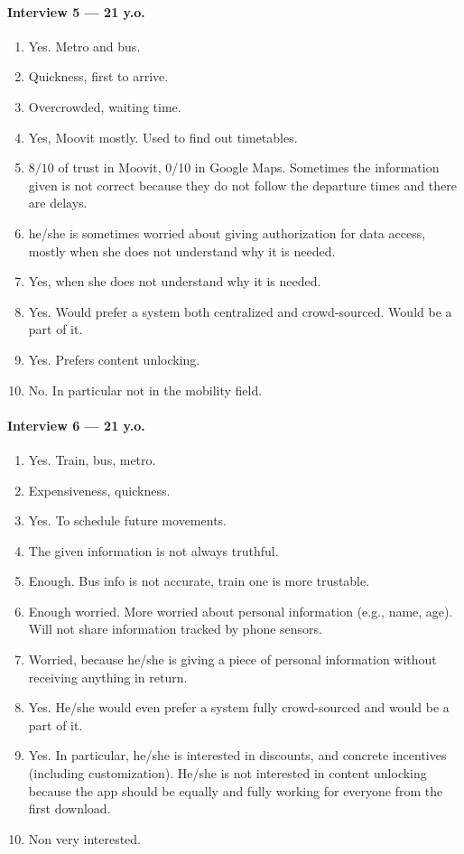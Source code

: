 \documentclass[a4paper, 11pt, twocolumn]{article}
\begin{document}
\paragraph*{Interview 5 --- 21 y.o.}
\begin{enumerate}
	\item Yes. Metro and bus.
	\item Quickness, first to arrive.
	\item Overcrowded, waiting time.
	\item Yes, Moovit mostly. Used to find out timetables.
	\item $8/10$ of trust in Moovit, 0/10 in Google Maps. Sometimes the information given is not correct because they do not follow the departure times and there are delays.
	\item he/she is sometimes worried about giving authorization for data access, mostly when she does not understand why it is needed.
	\item Yes, when she does not understand why it is needed.
	\item Yes. Would prefer a system both centralized and crowd-sourced. Would be a part of it.
	\item Yes. Prefers content unlocking.
	\item No. In particular not in the mobility field.
\end{enumerate}


\paragraph*{Interview 6 --- 21 y.o.}
\begin{enumerate}
	\item Yes. Train, bus, metro.
	\item Expensiveness, quickness.
	\item Yes. To schedule future movements.
	\item The given information is not always truthful.
	\item Enough. Bus info is not accurate, train one is more trustable.
	\item Enough worried. More worried about personal information (e.g., name, age). Will not share information tracked by phone sensors.
	\item Worried, because he/she is giving a piece of personal information without receiving anything in return.
	\item Yes. He/she would even prefer a system fully crowd-sourced and would be a part of it.
	\item Yes. In particular, he/she is interested in discounts, and concrete incentives (including customization). He/she is not interested in content unlocking because the app should be equally and fully working for everyone from the first download.
	\item Non very interested.
\end{enumerate}
\end{document}
